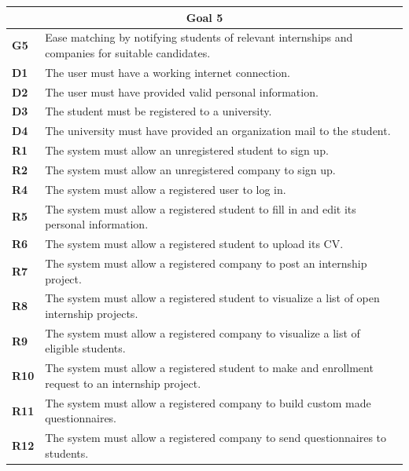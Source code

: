 \begin{table}[H]
    \centering
    \begin{tabular}{|l|m{10cm}|}
        \hline \multicolumn{2}{|c|}{\textbf{Goal 5}} \\
        \hline \textbf{G5} & Ease matching by notifying students of relevant internships and companies for suitable candidates. \\
        \hline \textbf{D1} & The user must have a working internet connection. \\
        \hline \textbf{D2} & The user must have provided valid personal information. \\
        \hline \textbf{D3} & The student must be registered to a university. \\
        \hline \textbf{D4} & The university must have provided an organization mail to the student. \\
        \hline \textbf{R1} & The system must allow an unregistered student to sign up.\\
        \hline \textbf{R2} & The system must allow an unregistered company to sign up. \\
        \hline \textbf{R4} & The system must allow a registered user to log in. \\
        \hline \textbf{R5} & The system must allow a registered student to fill in and edit its personal information. \\
        \hline \textbf{R6} & The system must allow a registered student to upload its CV. \\
        \hline \textbf{R7} & The system must allow a registered company to post an internship project. \\
        \hline \textbf{R8} & The system must allow a registered student to visualize a list of open internship projects. \\
        \hline \textbf{R9} & The system must allow a registered company to visualize a list of eligible students. \\
        \hline \textbf{R10} & The system must allow a registered student to make and enrollment request to an internship project. \\
        \hline \textbf{R11} & The system must allow a registered company to build custom made questionnaires. \\
        \hline \textbf{R12} & The system must allow a registered company to send questionnaires to students. \\

\end{tabular}
\end{table}
